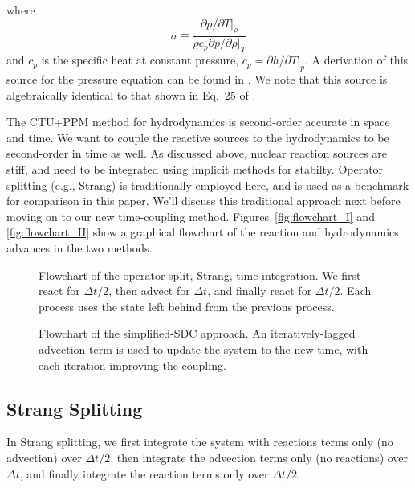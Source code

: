 \documentclass{aastex63}
\begin{document}
where
\begin{equation}
\sigma \equiv \frac{\partial p/\partial T |_\rho}{\rho c_p \partial p/\partial \rho |_T}
\end{equation}
and $c_p$ is the specific heat at constant pressure, $c_p = \partial
h/\partial T |_p$.  A derivation of this source for the pressure
equation can be found in \cite{ABNZ:III}.  We note that this source is
algebraically identical to that shown in Eq.~25 of \cite{castro}.

The CTU+PPM method for hydrodynamics is second-order accurate in space
and time.  We want to couple the reactive sources to the hydrodynamics
to be second-order in time as well.  As discussed above, nuclear
reaction sources are stiff, and need to be integrated using implicit
methods for stabilty.  Operator splitting (e.g., Strang) is
traditionally employed here, and is used as a benchmark for comparison
in this paper.  We'll discuss this traditional approach next before moving
on to our new time-coupling method.  Figures~\ref{fig:flowchart_I} and \ref{fig:flowchart_II} show a graphical
flowchart of the reaction and hydrodynamics advances in the two methods.

\begin{figure}[t]
\caption{\label{fig:strang_flowchart} Flowchart of the operator split,
  Strang, time integration.  We first react for $\Delta t/2$, then
  advect for $\Delta t$, and finally react for $\Delta t/2$.  Each
  process uses the state left behind from the previous process.}
\end{figure}

\begin{figure}[t]
\caption{\label{fig:sdc_flowchart} Flowchart of the simplified-SDC
  approach.  An iteratively-lagged advection term is used to update
  the system to the new time, with each iteration improving the
  coupling.}
\end{figure}



\subsection{Strang Splitting}

In Strang splitting, we first integrate the system with reactions terms only (no advection)
over $\Delta t/2$, then integrate the advection terms only (no reactions) over $\Delta t$,
and finally integrate the reaction terms only over $\Delta t/2$.
\end{document}
